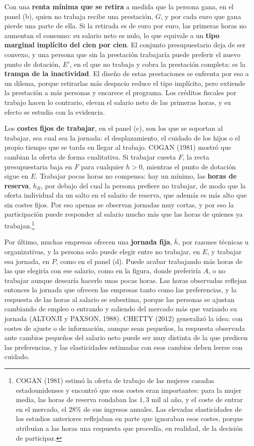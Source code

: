 \documentclass[10pt,a4paper]{article}
\begin{document}
Con una \textbf{renta mínima que se retira} a medida que la persona gana, en el panel (b), quien no trabaja recibe una prestación, $G$, y por cada euro que gana pierde una parte de ella. Si la retirada es de euro por euro, las primeras horas no aumentan el consumo: su salario neto es nulo, lo que equivale a un \textbf{tipo marginal implícito del cien por cien}. El conjunto presupuestario deja de ser convexo, y una persona que sin la prestación trabajaría puede preferir el nuevo punto de dotación, $E'$, en el que no trabaja y cobra la prestación completa: es la \textbf{trampa de la inactividad}. El diseño de estas prestaciones se enfrenta por eso a un dilema, porque retirarlas más despacio reduce el tipo implícito, pero extiende la prestación a más personas y encarece el programa. Los créditos fiscales por trabajo hacen lo contrario, elevan el salario neto de las primeras horas, y su efecto se estudia con la evidencia.

Los \textbf{costes fijos de trabajar}, en el panel (c), son los que se soportan al trabajar, sea cual sea la jornada: el desplazamiento, el cuidado de los hijos o el propio tiempo que se tarda en llegar al trabajo. COGAN (1981) mostró que cambian la oferta de forma cualitativa. Si trabajar cuesta $F$, la recta presupuestaria baja en $F$ para cualquier $h>0$, mientras el punto de dotación sigue en $E$. Trabajar pocas horas no compensa: hay un mínimo, las \textbf{horas de reserva}, $h_R$, por debajo del cual la persona prefiere no trabajar, de modo que la oferta individual da un salto en el salario de reserva, que además es más alto que sin costes fijos. Por eso apenas se observan jornadas muy cortas, y por eso la participación puede responder al salario mucho más que las horas de quienes ya trabajan.\footnote{%
    COGAN (1981) estimó la oferta de trabajo de las mujeres casadas estadounidenses y encontró que esos costes eran importantes: para la mujer media, las horas de reserva rondaban las $1{,}3$ mil al año, y el coste de entrar en el mercado, el $28\%$ de sus ingresos anuales. Las elevadas elasticidades de los estudios anteriores reflejaban en parte que ignoraban esos costes, porque atribuían a las horas una respuesta que procedía, en realidad, de la decisión de participar.
}

Por último, muchas empresas ofrecen una \textbf{jornada fija}, $\bar h$, por razones técnicas u organizativas, y la persona solo puede elegir entre no trabajar, en $E$, y trabajar esa jornada, en $P$, como en el panel (d). Puede acabar trabajando más horas de las que elegiría con ese salario, como en la figura, donde preferiría $A$, o no trabajar aunque desearía hacerlo unas pocas horas. Las horas observadas reflejan entonces la jornada que ofrecen las empresas tanto como las preferencias, y la respuesta de las horas al salario se subestima, porque las personas se ajustan cambiando de empleo o entrando y saliendo del mercado más que variando su jornada (ALTONJI y PAXSON, 1988). CHETTY (2012) generalizó la idea: con costes de ajuste o de información, aunque sean pequeños, la respuesta observada ante cambios pequeños del salario neto puede ser muy distinta de la que predicen las preferencias, y las elasticidades estimadas con esos cambios deben leerse con cuidado.
\end{document}
